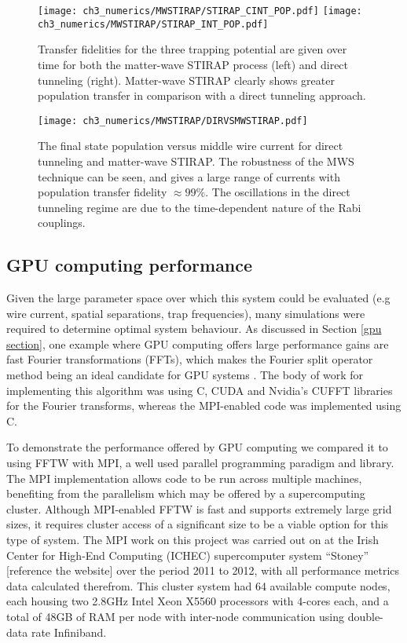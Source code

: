 \begin{figure}[tb]
    \centering
  \texttt{[image: ch3\_numerics/MWSTIRAP/STIRAP\_CINT\_POP.pdf]}
  \texttt{[image: ch3\_numerics/MWSTIRAP/STIRAP\_INT\_POP.pdf]}
  \caption{Transfer fidelities for the three trapping potential are given over time for both the matter-wave STIRAP process (left) and direct tunneling (right). Matter-wave STIRAP clearly shows greater population transfer in comparison with a direct tunneling approach.}
  \label{fig:mwsVsDT}
\end{figure}

\begin{figure}[tb]
    \centering
  \texttt{[image: ch3\_numerics/MWSTIRAP/DIRVSMWSTIRAP.pdf]}
  \caption{The final state population versus middle wire current for direct tunneling and matter-wave STIRAP. The robustness of the MWS technique can be seen, and gives a large range of currents with population transfer fidelity $\approx 99 \%$. The oscillations in the direct tunneling regime are due to the time-dependent nature of the Rabi couplings.}
  \label{fig:DIRVSMWSTIRAP}
\end{figure}


\subsection{GPU computing performance}
Given the large parameter space over which this system could be evaluated (e.g wire current, spatial separations, trap frequencies), many simulations were required to determine optimal system behaviour. As discussed in Section \ref{gpu section}, one example where GPU computing offers large performance gains are fast Fourier transformations (FFTs), which makes the Fourier split operator method being an ideal candidate for GPU systems \cite{Bauke:11}. The body of work for implementing this algorithm was using C, CUDA and Nvidia's CUFFT libraries for the Fourier transforms, whereas the MPI-enabled code was implemented using C.

To demonstrate the performance offered by GPU computing we compared it to using FFTW with MPI, a well used parallel programming paradigm and library. The MPI implementation allows code to be run across multiple machines, benefiting from the parallelism which may be offered by a supercomputing cluster. Although MPI-enabled FFTW is fast and supports extremely large grid sizes, it requires cluster access of a significant size to be a viable option for this type of system. The MPI work on this project was carried out on at the Irish Center for High-End Computing (ICHEC) supercomputer system ``Stoney'' [reference the website] over the period 2011 to 2012, with all performance metrics data calculated therefrom. This cluster system had 64 available compute nodes, each housing two 2.8GHz Intel Xeon X5560 processors with 4-cores each, and a total of 48GB of RAM per node with inter-node communication using double-data rate Infiniband.

